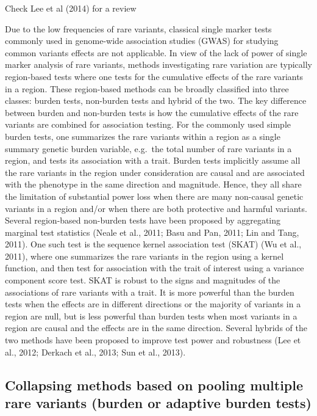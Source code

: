 \documentclass[]{book}
\theoremstyle{definition}
\theoremstyle{definition}
\theoremstyle{definition}
\theoremstyle{remark}
\begin{document}
Check Lee et al (2014) for a review

Due to the low frequencies of rare variants, classical single marker
tests commonly used in genome-wide association studies (GWAS) for
studying common variants effects are not applicable. In view of the lack
of power of single marker analysis of rare variants, methods
investigating rare variation are typically region-based tests where one
tests for the cumulative effects of the rare variants in a region. These
region-based methods can be broadly classified into three classes:
burden tests, non-burden tests and hybrid of the two. The key difference
between burden and non-burden tests is how the cumulative effects of the
rare variants are combined for association testing. For the commonly
used simple burden tests, one summarizes the rare variants within a
region as a single summary genetic burden variable, e.g.~the total
number of rare variants in a region, and tests its association with a
trait. Burden tests implicitly assume all the rare variants in the
region under consideration are causal and are associated with the
phenotype in the same direction and magnitude. Hence, they all share the
limitation of substantial power loss when there are many non-causal
genetic variants in a region and/or when there are both protective and
harmful variants. Several region-based non-burden tests have been
proposed by aggregating marginal test statistics (Neale et al., 2011;
Basu and Pan, 2011; Lin and Tang, 2011). One such test is the sequence
kernel association test (SKAT) (Wu et al., 2011), where one summarizes
the rare variants in the region using a kernel function, and then test
for association with the trait of interest using a variance component
score test. SKAT is robust to the signs and magnitudes of the
associations of rare variants with a trait. It is more powerful than the
burden tests when the effects are in different directions or the
majority of variants in a region are null, but is less powerful than
burden tests when most variants in a region are causal and the effects
are in the same direction. Several hybrids of the two methods have been
proposed to improve test power and robustness (Lee et al., 2012; Derkach
et al., 2013; Sun et al., 2013).

\subsection{Collapsing methods based on pooling multiple rare variants
(burden or adaptive burden
tests)}\label{collapsing-methods-based-on-pooling-multiple-rare-variants-burden-or-adaptive-burden-tests}
\end{document}
